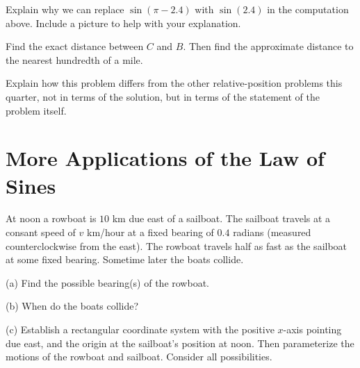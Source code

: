 \documentclass{ximera}
\begin{document}
\begin{example}
\begin{explanation}
\begin{question}  \label{Q34rg4t5rt}
Explain why we can replace $\sin (\pi -  2.4)$ with $\sin (2.4)$ in the computation above. Include a picture to help with your explanation.
\end{question}

\begin{question}   \label{Qd45r5643rs}
Find the exact distance between $C$ and $B$. Then find the approximate distance to the nearest hundredth of a mile.
\end{question}


\begin{question}  \label{Qerdef6645yu}
Explain how this problem differs from the other relative-position problems this quarter, not in terms of the solution, but in terms of the statement of the problem itself.
\end{question}




\end{explanation}


\end{example}


\section{More Applications of the Law of Sines}
\begin{question}  \label{Q343f44fd}
At noon a rowboat is $10$ km due east of a sailboat. The sailboat travels at a consant speed of $v$ km/hour at a fixed bearing of $0.4$ radians (measured counterclockwise from the east). The rowboat travels half as fast as the sailboat at some fixed bearing. Sometime later the boats collide.

(a) Find the possible bearing(s) of the rowboat.

(b) When do the boats collide?

(c) Establish a rectangular coordinate system with the positive $x$-axis pointing due east, and the origin at the sailboat's position at noon. Then parameterize the motions of the rowboat and sailboat. Consider all possibilities.

\end{question}
\end{document}
